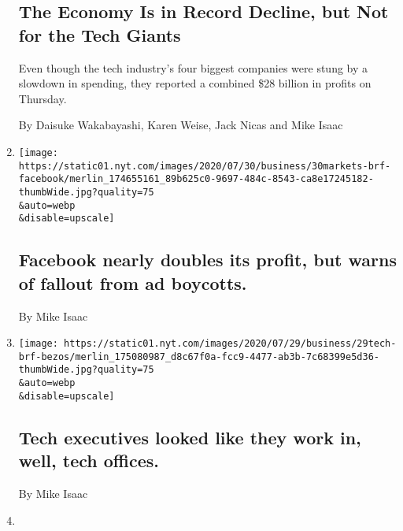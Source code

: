 \begin{enumerate}
  \hypertarget{the-economy-is-in-record-decline-but-not-for-the-tech-giants-1}{%
  \subsection{The Economy Is in Record Decline, but Not for the Tech
  Giants}\label{the-economy-is-in-record-decline-but-not-for-the-tech-giants-1}}

  Even though the tech industry's four biggest companies were stung by a
  slowdown in spending, they reported a combined \$28 billion in profits
  on Thursday.

  By Daisuke Wakabayashi, Karen Weise, Jack Nicas and Mike Isaac
\item
  \href{/live/2020/07/30/business/stock-market-today-coronavirus/facebook-nearly-doubles-its-profit-but-warns-of-fallout-from-ad-boycotts}{}

  \texttt{[image: https://static01.nyt.com/images/2020/07/30/business/30markets-brf-facebook/merlin\_174655161\_89b625c0-9697-484c-8543-ca8e17245182-thumbWide.jpg?quality=75\\\&auto=webp\\\&disable=upscale]}

  \hypertarget{facebook-nearly-doubles-its-profit-but-warns-of-fallout-from-ad-boycotts}{%
  \subsection{Facebook nearly doubles its profit, but warns of fallout
  from ad
  boycotts.}\label{facebook-nearly-doubles-its-profit-but-warns-of-fallout-from-ad-boycotts}}

  By Mike Isaac
\item
  \href{/live/2020/07/29/technology/tech-ceos-hearing-testimony/tech-executives-looked-like-they-work-in-well-tech-offices}{}

  \texttt{[image: https://static01.nyt.com/images/2020/07/29/business/29tech-brf-bezos/merlin\_175080987\_d8c67f0a-fcc9-4477-ab3b-7c68399e5d36-thumbWide.jpg?quality=75\\\&auto=webp\\\&disable=upscale]}

  \hypertarget{tech-executives-looked-like-they-work-in-well-tech-offices}{%
  \subsection{Tech executives looked like they work in, well, tech
  offices.}\label{tech-executives-looked-like-they-work-in-well-tech-offices}}

  By Mike Isaac
\item
  \href{/live/2020/07/29/technology/tech-ceos-hearing-testimony/lawmakers-said-documents-show-facebook-tried-to-neutralize-a-competitive-threat}{}


\end{enumerate}
